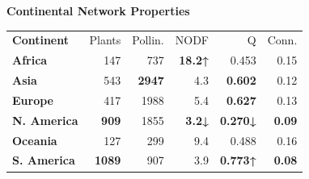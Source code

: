 \documentclass[final]{beamer}
\newlength{\ColW}  %
\newcommand{\ebgaramondFont}{\fontfamily{EBGaramond-OsF}\selectfont}
\newcommand{\monoFont}{\ttfamily}
\newcommand{\histat}[1]{{\monoFont\bfseries\color{teal}#1}}
\newcommand{\lostat}[1]{{\monoFont\bfseries\color{coral}#1}}
\newcommand{\gcstat}[1]{{\monoFont\bfseries\color{darkgreen}#1}}
\newcommand{\ocstat}[1]{{\monoFont\bfseries\color{headamber}#1}}
\begin{document}
\begin{frame}[t]{}
{\begin{minipage}[t]{\ColW}
  \begin{tcolorbox}[
    enhanced, sharp corners, frame hidden,
    colback=panel, left=8pt, right=8pt, top=0pt, bottom=8pt,
    width=15.0in,
    drop shadow={opacity=0.20},
    before={\vspace{2pt}}, after={\vspace{8pt}}]
    \begin{tcolorbox}[enhanced, sharp corners, frame hidden,
      colback=headteal, left=8pt, right=8pt, top=4pt, bottom=4pt, width=\linewidth]
      \enspace
      {\ebgaramondFont\bfseries\fontsize{14}{16}\selectfont\color{ivory}%
       Continental Network Properties}
    \end{tcolorbox}

    \vspace{6pt}
    \renewcommand{\arraystretch}{1.18}
    \fontsize{10}{13}\selectfont
    \begin{tabularx}{\linewidth}{>{\bfseries}X r r r r r}
      \rowcolor{darkgrn}%
      \textcolor{gold2}{\small Continent} &
      \textcolor{gold2}{\small Plants} &
      \textcolor{gold2}{\small Pollin.} &
      \textcolor{gold2}{\small NODF} &
      \textcolor{gold2}{\small Q} &
      \textcolor{gold2}{\small Conn.} \\
      Africa      & 147  & 737  & \ocstat{18.2↑}& 0.453           & 0.15 \\
      \rowcolor{panel2}
      Asia        & 543  & \lostat{2947} & 4.3   & \histat{0.602}  & 0.12 \\
      Europe      & 417  & 1988 & 5.4           & \histat{0.627}  & 0.13 \\
      \rowcolor{panel2}
      N. America  & \lostat{909} & 1855 & \lostat{3.2↓} & \lostat{0.270↓} & \lostat{0.09} \\
      Oceania     & 127  & 299  & 9.4           & 0.488           & 0.16 \\
      \rowcolor{panel2}
      S. America  & \histat{1089} & 907 & 3.9   & \gcstat{0.773↑} & \lostat{0.08} \\
    \end{tabularx}


\end{tcolorbox}
\end{minipage}}
\end{frame}
\end{document}
